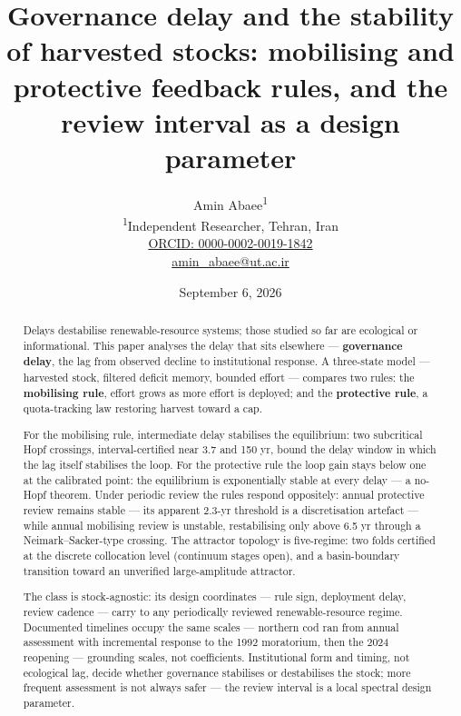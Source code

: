 \documentclass[11pt]{article}
\begin{document}
\title{Governance delay and the stability of harvested stocks: mobilising and protective feedback rules, and the review interval as a design parameter}
\author{Amin Abaee\textsuperscript{1}\\[0.35em]
{\small\textsuperscript{1}Independent Researcher, Tehran, Iran}\\[0.55em]
{\small\href{https://orcid.org/0000-0002-0019-1842}{ORCID: 0000-0002-0019-1842}}\\[0.3em]
{\small\href{mailto:amin\_abaee@ut.ac.ir}{amin\_abaee@ut.ac.ir}}}
\date{September 6, 2026}
\maketitle

\begin{abstract}


Delays destabilise renewable-resource systems; those studied so far are
ecological or informational. This paper analyses the delay that sits
elsewhere --- \textbf{governance delay}, the lag from observed decline
to institutional response. A three-state model --- harvested stock,
filtered deficit memory, bounded effort --- compares two rules: the
\textbf{mobilising rule}, effort grows as more effort is deployed; and
the \textbf{protective rule}, a quota-tracking law restoring harvest
toward a cap.

For the mobilising rule, intermediate delay stabilises the equilibrium:
two subcritical Hopf crossings, interval-certified near 3.7 and 150 yr,
bound the delay window in which the lag itself stabilises the loop. For
the protective rule the loop gain stays below one at the calibrated
point: the equilibrium is exponentially stable at every delay --- a
no-Hopf theorem. Under periodic review the rules respond oppositely:
annual protective review remains stable --- its apparent 2.3-yr
threshold is a discretisation artefact --- while annual mobilising
review is unstable, restabilising only above 6.5 yr through a
Neimark--Sacker-type crossing. The attractor topology is five-regime:
two folds certified at the discrete collocation level (continuum stages
open), and a basin-boundary transition toward an unverified
large-amplitude attractor.

The class is stock-agnostic: its design coordinates --- rule sign,
deployment delay, review cadence --- carry to any periodically reviewed
renewable-resource regime. Documented timelines occupy the same scales
--- northern cod ran from annual assessment with incremental response to
the 1992 moratorium, then the 2024 reopening --- grounding scales, not
coefficients. Institutional form and timing, not ecological lag, decide
whether governance stabilises or destabilises the stock; more frequent
assessment is not always safer --- the review interval is a local
spectral design parameter.

\end{abstract}
\end{document}
